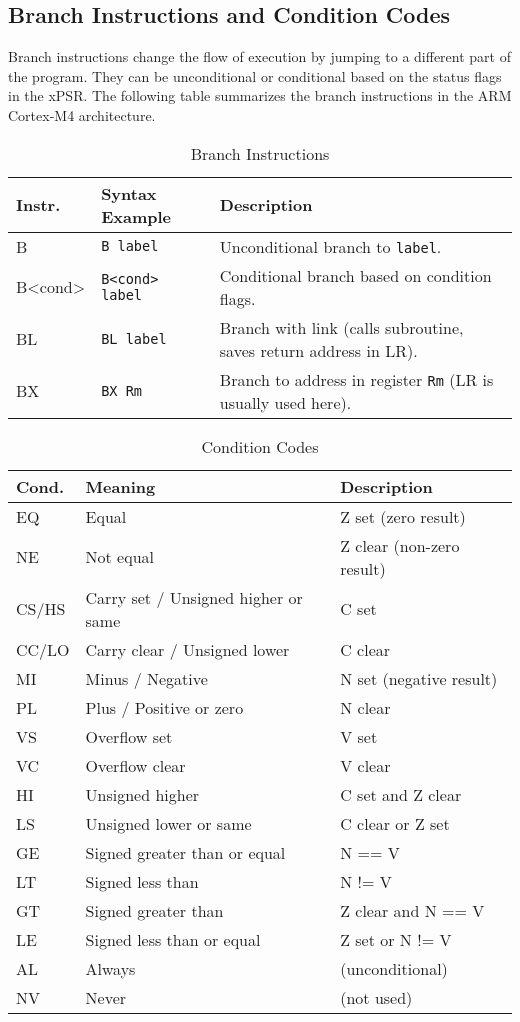 \subsection{Branch Instructions and Condition Codes}
Branch instructions change the flow of execution by jumping to a different part of the program. They can be unconditional or conditional based on the status flags in the xPSR. The following table summarizes the branch instructions in the ARM Cortex-M4 architecture.
\begin{table}[H]
\centering
\caption{Branch Instructions}
\small
\begin{tabularx}{\linewidth}{@{}l l X@{}}
\toprule
\textbf{Instr.} & \textbf{Syntax Example} & \textbf{Description} \\
\midrule
B    & \texttt{B label} & Unconditional branch to \texttt{label}. \\
B<cond> & \texttt{B<cond> label} & Conditional branch based on condition flags. \\
BL   & \texttt{BL label} & Branch with link (calls subroutine, saves return address in LR). \\
BX   & \texttt{BX Rm} & Branch to address in register \texttt{Rm} (LR is usually used here). \\
\bottomrule
\end{tabularx}
\vspace{2pt}
\end{table}

\begin{table}[H]
\centering
\caption{Condition Codes}
\small
\begin{tabularx}{\linewidth}{@{}l l X@{}}
\toprule
\textbf{Cond.} & \textbf{Meaning} & \textbf{Description} \\
\midrule
EQ  & Equal          & Z set (zero result) \\
NE  & Not equal      & Z clear (non-zero result) \\
CS/HS & Carry set / Unsigned higher or same & C set \\
CC/LO & Carry clear / Unsigned lower & C clear \\
MI  & Minus / Negative & N set (negative result) \\
PL  & Plus / Positive or zero & N clear \\
VS  & Overflow set   & V set \\
VC  & Overflow clear & V clear \\
HI  & Unsigned higher & C set and Z clear \\
LS  & Unsigned lower or same & C clear or Z set \\
GE  & Signed greater than or equal & N == V \\
LT  & Signed less than & N != V \\
GT  & Signed greater than & Z clear and N == V \\
LE  & Signed less than or equal & Z set or N != V \\
AL  & Always         & (unconditional) \\
NV  & Never          & (not used) \\
\bottomrule
\end{tabularx}
\vspace{2pt}
\end{table}
